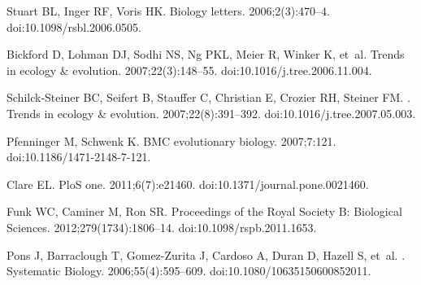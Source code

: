 \documentclass[10pt,letterpaper]{article}
\begin{document}
%
%
% 
%
\begin{thebibliography}{10}

    Stuart BL, Inger RF, Voris HK.
    \newblock Biology letters. 2006;2(3):470--4.
    \newblock doi:{10.1098/rsbl.2006.0505}.

    Bickford D, Lohman DJ, Sodhi NS, Ng PKL, Meier R, Winker K, et~al.
    \newblock Trends in ecology {\&} evolution. 2007;22(3):148--55.
    \newblock doi:{10.1016/j.tree.2006.11.004}.

    Schilck-Steiner BC, Seifert B, Stauffer C, Christian E, Crozier RH, Steiner FM.
    .
    \newblock Trends in ecology {\&} evolution. 2007;22(8):391--392.
    \newblock doi:{10.1016/j.tree.2007.05.003}.

    Pfenninger M, Schwenk K.
    \newblock BMC evolutionary biology. 2007;7:121.
    \newblock doi:{10.1186/1471-2148-7-121}.

    Clare EL.
    \newblock PloS one. 2011;6(7):e21460.
    \newblock doi:{10.1371/journal.pone.0021460}.

    Funk WC, Caminer M, Ron SR.
    \newblock Proceedings of the Royal Society B: Biological Sciences.
    2012;279(1734):1806--14.
    \newblock doi:{10.1098/rspb.2011.1653}.

    Pons J, Barraclough T, Gomez-Zurita J, Cardoso A, Duran D, Hazell S, et~al.
    .
    \newblock Systematic Biology. 2006;55(4):595--609.
    \newblock doi:{10.1080/10635150600852011}.


\end{thebibliography}
\end{document}
